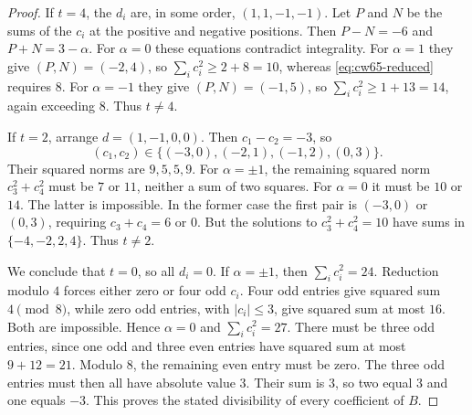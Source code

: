 \documentclass[11pt]{article}
\theoremstyle{remark}
\numberwithin{equation}{section}
\begin{document}
\begin{proof}
If $t=4$, the $d_i$ are, in some order, $(1,1,-1,-1)$.
Let $P$ and $N$ be the sums of the $c_i$ at the positive and negative
positions. Then $P-N=-6$ and $P+N=3-\alpha$.
For $\alpha=0$ these equations contradict integrality.
For $\alpha=1$ they give $(P,N)=(-2,4)$, so
$\sum_i c_i^2\ge2+8=10$, whereas
\eqref{eq:cw65-reduced} requires $8$.
For $\alpha=-1$ they give $(P,N)=(-1,5)$, so
$\sum_i c_i^2\ge1+13=14$, again exceeding $8$.
Thus $t\ne4$.

If $t=2$, arrange $d=(1,-1,0,0)$. Then $c_1-c_2=-3$, so
\[
 (c_1,c_2)\in\{(-3,0),(-2,1),(-1,2),(0,3)\}.
\]
Their squared norms are $9,5,5,9$.
For $\alpha=\pm1$, the remaining squared norm $c_3^2+c_4^2$ must be
$7$ or $11$, neither a sum of two squares. For $\alpha=0$ it must be
$10$ or $14$. The latter is impossible. In the former case the first
pair is $(-3,0)$ or $(0,3)$, requiring $c_3+c_4=6$ or $0$.
But the solutions to $c_3^2+c_4^2=10$ have sums in $\{-4,-2,2,4\}$.
Thus $t\ne2$.

We conclude that $t=0$, so all $d_i=0$. If $\alpha=\pm1$, then
$\sum_i c_i^2=24$. Reduction modulo $4$ forces either zero or four odd
$c_i$. Four odd entries give squared sum $4\pmod8$, while zero odd
entries, with $|c_i|\le3$, give squared sum at most $16$.
Both are impossible. Hence $\alpha=0$ and $\sum_i c_i^2=27$.
There must be three odd entries, since one odd and three even entries
have squared sum at most $9+12=21$. Modulo $8$, the remaining even entry
must be zero. The three odd entries must then all have absolute value $3$.
Their sum is $3$, so two equal $3$ and one equals $-3$.
This proves the stated divisibility of every coefficient of $B$.
\end{proof}
\end{document}
